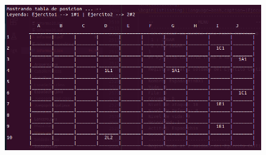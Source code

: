 \documentclass{article}
\begin{document}
	\begin{figure}[H]
		\centering
		\includegraphics[width=1.0\textwidth,keepaspectratio]{img/Commit11.png}
	\end{figure}
\end{document}
